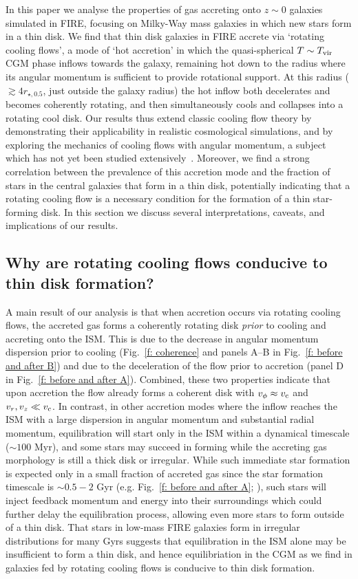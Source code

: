\documentclass[fleqn,usenatbib]{mnras}
\newcommand{\Tvir}{T_{\rm vir}}
\begin{document}
In this paper we analyse the properties of gas accreting onto $z\sim0$ galaxies simulated in FIRE, focusing on Milky-Way mass galaxies in which new stars form in a thin disk. 
We find that thin disk galaxies in FIRE accrete via `rotating cooling flows', a mode of `hot accretion' in which the quasi-spherical $T\sim\Tvir$ CGM phase inflows towards the galaxy, remaining hot down to the radius where its angular momentum is sufficient to provide rotational support.
At this radius ($\gtrsim 4 r_{\star,0.5}$, just outside the galaxy radius) the hot inflow both decelerates and becomes coherently rotating, and then simultaneously cools and collapses into a rotating cool disk.
Our results thus extend classic cooling flow theory by demonstrating their applicability in realistic cosmological simulations, and by exploring the mechanics of cooling flows with angular momentum, a subject which has not yet been studied extensively~\citep[c.f.][]{Cowie1980, Stern2020}.
Moreover, we find a strong correlation between the prevalence of this accretion mode and the fraction of stars in the central galaxies that form in a thin disk, potentially indicating that a rotating cooling flow is a necessary condition for the formation of a thin star-forming disk.
In this section we discuss several interpretations, caveats, and implications of our results. 

\subsection{Why are rotating cooling flows conducive to thin disk formation?}
\label{s: why CFs thin disks}

A main result of our analysis is that when accretion occurs via rotating cooling flows, the accreted gas forms a coherently rotating disk \textit{prior} to cooling and accreting onto the ISM.
This is due to the decrease in angular momentum dispersion prior to cooling (Fig.~\ref{f: coherence} and panels A--B in Fig.~\ref{f: before and after B}) and due to the deceleration of the flow prior to accretion (panel D in Fig.~\ref{f: before and after A}).
Combined, these two properties indicate that upon accretion the flow already forms a coherent disk with $v_\phi\approx v_{\rm c}$ and $v_r, v_z \ll v_{\rm c}$.
In contrast, in other accretion modes where the inflow reaches the ISM with a large dispersion in angular momentum and substantial radial momentum, equilibration will start only in the ISM within a dynamical timescale ($\sim 100$ Myr), and some stars may succeed in forming while the accreting gas morphology is still a thick disk or irregular.
While such immediate star formation is expected only in a small fraction of accreted gas since the star formation timescale is $\sim0.5-2$ Gyr (e.g. Fig.~\ref{f: before and after A}; \citealt{Bigiel2008}), such stars will inject feedback momentum and energy into their surroundings which could further delay the equilibration process, allowing even more stars to form outside of a thin disk.
That stars in low-mass FIRE galaxies form in irregular distributions for many Gyrs suggests that equilibration in the ISM alone may be insufficient to form a thin disk, and hence equilibriation in the CGM as we find in galaxies fed by rotating cooling flows is conducive to thin disk formation. 
\end{document}
